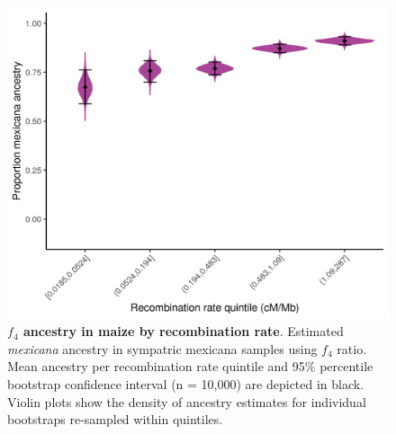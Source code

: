 \begin{figure}[ht]
\includegraphics[width=\textwidth]{chapter2/figures/f4_sympatric_mexicana_pop22_byr5.png}
\caption{\color{Gray} \textbf{$f_4$ ancestry in maize by recombination rate}. Estimated \textit{mexicana} ancestry in sympatric mexicana samples using $f_4$ ratio. Mean ancestry per recombination rate quintile and 95\% percentile bootstrap confidence interval (n = 10,000) are depicted in black. Violin plots show the density of ancestry estimates for individual bootstraps re-sampled within quintiles.}
\label{f4_mexicana_by_r}
\end{figure}

